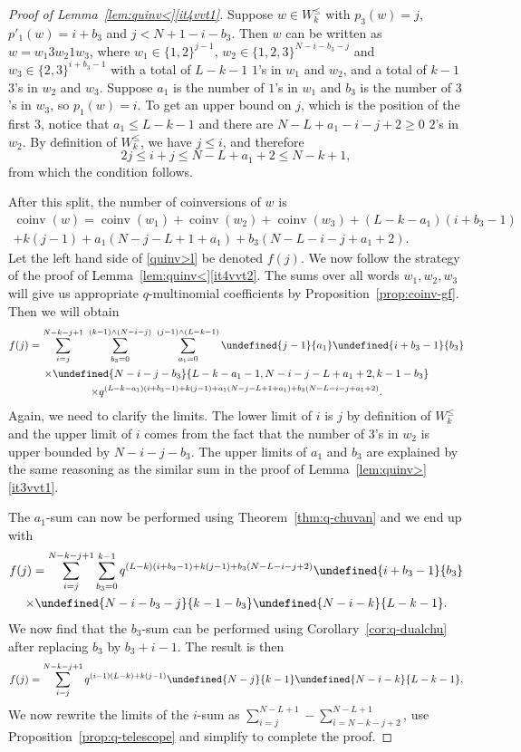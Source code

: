 \documentclass[11pt]{article}
\theoremstyle{definition}
\providecommand{\qbinom}[2]{\genfrac{[}{]}{0pt}{}{#1}{#2}}
\numberwithin{equation}{section}
\DeclareMathOperator{\coinv}{coinv}
\let\qbinom\undefined
\newcommand{\qbinom}[2]{\bgroup\renewcommand*{\arraystretch}{1}\begin{bmatrix} #1 \\ #2\end{bmatrix} \egroup}
\begin{document}
\begin{proof}[Proof of Lemma~\ref{lem:quinv<}\ref{it4vvt1}]
Suppose $w \in  W_k^\leq$ with $p_3(w) = j$, $p'_1(w) = i+b_3$ and $j < N+1 - i-b_3$. Then
$w$ can be written as $w = w_1 3 w_2 1 w_3$, where $w_1 \in \{1,2\}^{j-1}$, $w_2 \in \{1,2,3\}^{N-i-b_3-j}$ 
and $w_3 \in \{2,3\}^{i+b_3-1}$ with a total of $L-k-1$ $1$'s in $w_1$ and $w_2$, and a total of
$k-1$ $3$'s in $w_2$ and $w_3$. 
Suppose $a_1$ is the number of $1$'s in $w_1$ and $b_3$ is the number of $3$'s in $w_3$, so $p_1(w) = i$. To get an upper bound on $j$, which is the position of the first $3$, notice that $a_1 \leq L-k-1$ and
there are $N-L+a_1-i-j+2\geq 0$ $2$'s in $w_2$. By definition of $W_k^{\leq}$, we have $j \leq i$, and therefore
\[
2j \leq i+j \leq N - L + a_1 + 2 \leq N - k+1,
\]
from which the condition follows.

After this split, the number of coinversions of $w$ is
\begin{multline*}
\coinv(w) = \coinv(w_1) + \coinv(w_2) +\coinv(w_3) + (L-k-a_1)(i+b_3-1)  \\
+ k(j-1) + a_1(N-j-L+1+a_1) + b_3(N-L-i-j+a_1+2).
\end{multline*}
Let the left hand side of \eqref{quinv>l} be denoted $f(j)$.
We now follow the strategy of the proof of Lemma~\ref{lem:quinv<}\ref{it4vvt2}. 
The sums over all
words $w_1, w_2, w_3$ will give us appropriate $q$-multinomial coefficients by 
Proposition~\ref{prop:coinv-gf}. Then we will obtain
\begin{multline*}
f(j) = \sum_{i = j}^{N-k-j+1}\  \sum_{b_3 = 0}^{(k-1) \wedge (N-i-j)}\ \sum_{a_1 = 0}^{(j-1) \wedge (L-k-1)} 
\qbinom {j-1}{a_1} \qbinom{i+b_3-1}{b_3} \\
\times\qbinom {N-i-j-b_3}{L-k-a_1-1, N-i-j-L+a_1+2,k-1-b_3} \\
\times q^{(L-k-a_1)(i+b_3-1) + k(j-1) + a_1(N-j-L+1+a_1) + b_3(N-L-i-j+a_1+2)}.
\end{multline*}
Again, we need to clarify the limits. The lower limit of $i$ is $j$ by definition of $W_k^\leq$
and the upper limit of $i$ comes from the fact that the number of $3$'s in $w_2$ is upper bounded
by $N-i-j-b_3$. The upper limits of $a_1$ and $b_3$ are explained by the same reasoning
as the similar sum in the proof of Lemma~\ref{lem:quinv>}\ref{it3vvt1}.

The $a_1$-sum can now be performed using Theorem~\ref{thm:q-chuvan} and we end up with
\begin{multline*}
f(j) =  \sum_{i = j}^{N-k-j+1}  \sum_{b_3 = 0}^{k-1}  q^{(L-k)(i+b_3-1) + k(j-1) + b_3(N-L-i-j+2)} \qbinom{i+b_3-1}{b_3} \\
\times \qbinom {N-i-b_3-j}{k-1-b_3}  \qbinom {N-i-k}{L-k-1} .
\end{multline*}
We now find that the $b_3$-sum can be performed using Corollary~\ref{cor:q-dualchu} after replacing $b_3$
by $b_3+i-1$.  
The result is then
\[
f(j) = \sum_{i = j}^{N-k-j+1}  q^{(i-1)(L-k) + k(j-1)}  \qbinom {N-j}{k-1}\qbinom {N-i-k}{L-k-1} ,
\]
We now rewrite the limits of the $i$-sum as $\sum_{i = j}^{N-L+1} - \sum_{i = N-k-j+2}^{N-L+1}$,
 use Proposition~\ref{prop:q-telescope} and simplify to complete the proof.
\end{proof}
\end{document}
